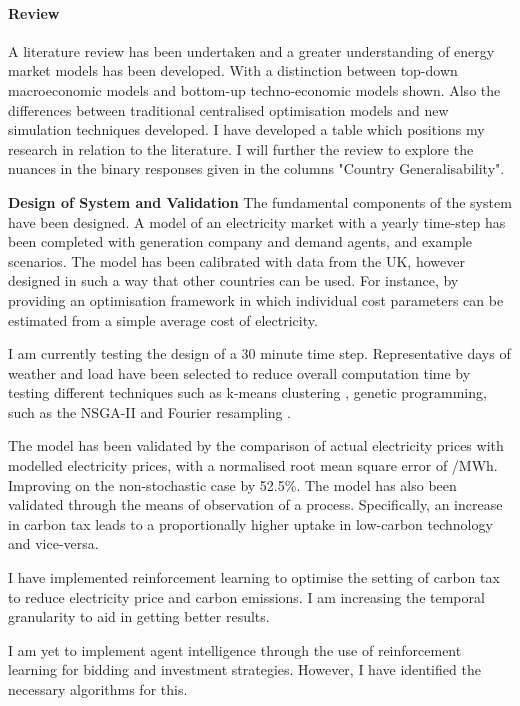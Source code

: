 \documentclass[12pt]{article}
\begin{document}
\paragraph{Review}

A literature review has been undertaken and a greater understanding of energy market models has been developed. With a distinction between top-down macroeconomic models and bottom-up techno-economic models shown. Also the differences between traditional centralised optimisation models and new simulation techniques developed. I have developed a table which positions my research in relation to the literature. I will further the review to explore the nuances in the binary responses given in the columns "Country Generalisability".

{\parindent0pt
\vspace{2mm}
\textbf{Design of System and Validation}
}
The fundamental components of the system have been designed. A model of an electricity market with a yearly time-step has been completed with generation company and demand agents, and example scenarios. The model has been calibrated with data from the UK, however designed in such a way that other countries can be used. For instance, by providing an optimisation framework in which individual cost parameters can be estimated from a simple average cost of electricity.

I am currently testing the design of a 30 minute time step. Representative days of weather and load have been selected to reduce overall computation time by testing different techniques such as k-means clustering \cite{Forgy65}, genetic programming, such as the NSGA-II \cite{Valkanas2014} and Fourier resampling \cite{Cooley2006}. 

The model has been validated by the comparison of actual electricity prices with modelled electricity prices, with a normalised root mean square error of /MWh. Improving on the non-stochastic case by 52.5\%. The model has also been validated through the means of observation of a process. Specifically, an increase in carbon tax leads to a proportionally higher uptake in low-carbon technology and vice-versa. 

I have implemented reinforcement learning to optimise the setting of carbon tax to reduce electricity price and carbon emissions. I am increasing the temporal granularity to aid in getting better results.

I am yet to implement agent intelligence through the use of reinforcement learning for bidding and investment strategies. However, I have identified the necessary algorithms for this.
\end{document}
